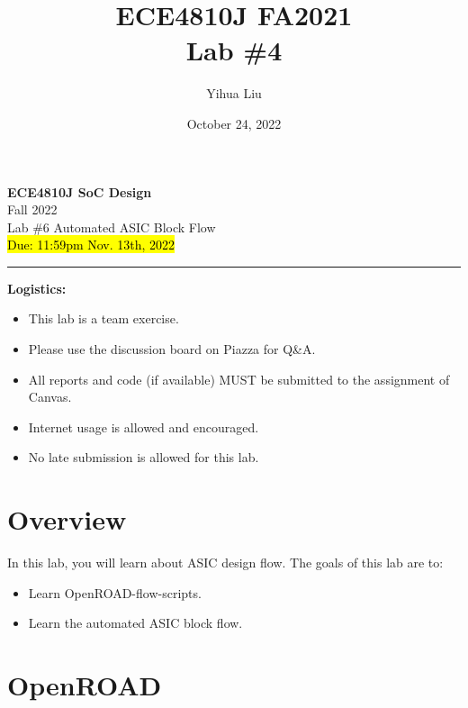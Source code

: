 \documentclass[a4paper,12pt,twoside]{article}
\author{Yihua Liu}
\title{ECE4810J FA2021\\ \small Lab \#4}
\date{October 24, 2022}
\begin{document}
\thispagestyle{fancy}

\begin{center}
    \vspace*{0pt}
    \Large{\textbf{ECE4810J SoC Design}}\\
    \vspace*{2pt}
    \large{Fall 2022}\\
    \vspace*{10pt}
    \Large{\textcolor{caption2color}{Lab \#6 Automated ASIC Block Flow}}\\
    \normalsize{\hl{Due: 11:59pm Nov. 13th, 2022}}
    \rule[-5pt]{.97\linewidth}{0.05em}
\end{center}

\textbf{Logistics:}
\begin{itemize}
    \item This lab is a team exercise.
    \item Please use the discussion board on Piazza for Q\&A.
    \item All reports and code (if available) MUST be submitted to the assignment of Canvas.
    \item Internet usage is allowed and encouraged.
    \item No late submission is allowed for this lab.
\end{itemize}

\tableofcontents

\newpage
\section{Overview}
In this lab, you will learn about ASIC design flow. The goals of this lab are to:
\begin{itemize}
    \item Learn OpenROAD-flow-scripts.
    \item Learn the automated ASIC block flow.
\end{itemize}

\section{OpenROAD}\label{SOR}
\end{document}
